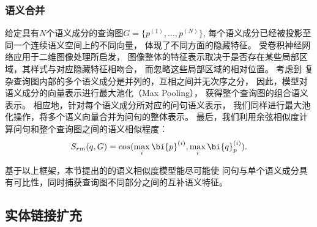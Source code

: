 \subsubsection{语义合并}

给定具有$N$个语义成分的查询图$G = \{p^{(1)}, \dots, p^{(N)}\}$,
每个语义成分已经被投影至同一个连续语义空间上的不同向量，
体现了不同方面的隐藏特征。
受卷积神经网络应用于二维图像处理所启发，
图像整体的特征表示取决于是否存在某些局部区域，其样式与对应隐藏特征相吻合，
而忽略这些局部区域的相对位置。
考虑到 复杂查询图内部的多个语义成分是并列的，互相之间并无次序之分，
因此，模型对语义成分的向量表示进行最大池化（Max Pooling），
获得整个查询图的组合语义表示。
相应地，针对每个语义成分所对应的问句语义表示，
我们同样进行最大池化操作，将多个语义向量合并为问句的整体表示。
最后，我们利用余弦相似度计算问句和整个查询图之间的语义相似程度：
\begin{equation}
S_{rm}(q, G) = cos(\max_{i}{\bi{p}^{(i)}}, \max_{i}{\bi{q}_p^{(i)}}).
\end{equation}

基于以上框架，本节提出的的语义相似度模型能尽可能使
问句与单个语义成分具有可比性，同时捕获查询图不同部分之间的互补语义特征。


\subsection{实体链接扩充}
\label{sec:compqa-ensemble}

